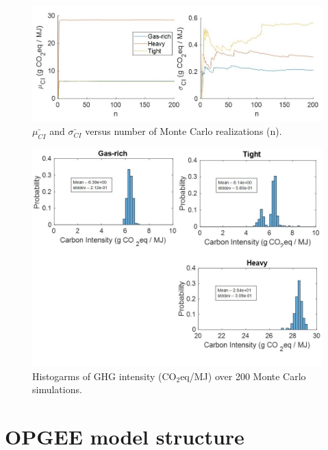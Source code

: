 \documentclass[11pt]{report}
\begin{document}
\begin{figure}[!htbp]
\includegraphics[width=1\columnwidth]{documentation/images/User_Guide_figs/uncertaintyresults_2.jpg}
\caption{$\bar{\mu_{CI}}$ and $\bar{\sigma_{CI}}$ versus number of Monte Carlo realizations (n).}
\label{fig:example_uncertainty}
\end{figure}


\begin{figure}[!htbp]
\includegraphics[width=1\columnwidth]{documentation/images/User_Guide_figs/histos.jpg}
\caption{Histogarms of GHG intensity (CO$_2$eq/MJ) over 200 Monte Carlo simulations.}
\label{fig:example_uncertainty}
\end{figure}

\clearpage

\section{OPGEE model structure}
\label{sec:model_structure}
\end{document}
